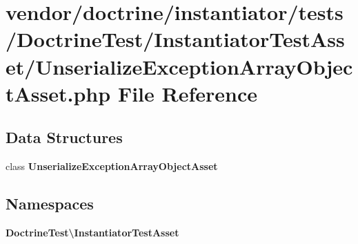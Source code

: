 \section{vendor/doctrine/instantiator/tests/\+Doctrine\+Test/\+Instantiator\+Test\+Asset/\+Unserialize\+Exception\+Array\+Object\+Asset.php File Reference}
\label{_unserialize_exception_array_object_asset_8php}
\subsection*{Data Structures}
\begin{DoxyCompactItemize}
\item 
class {\bf Unserialize\+Exception\+Array\+Object\+Asset}
\end{DoxyCompactItemize}
\subsection*{Namespaces}
\begin{DoxyCompactItemize}
\item 
 {\bf Doctrine\+Test\textbackslash{}\+Instantiator\+Test\+Asset}
\end{DoxyCompactItemize}
